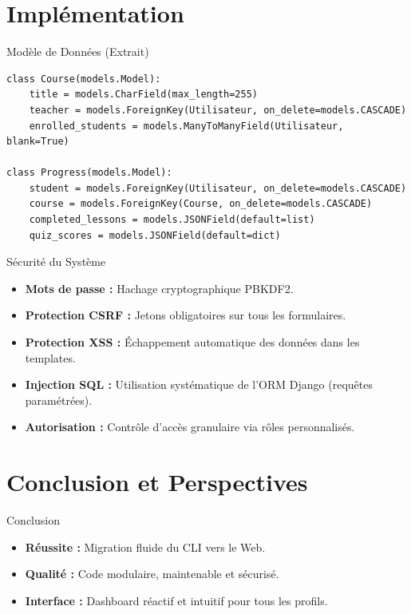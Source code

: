 \documentclass[10pt]{beamer}
\begin{document}
\section{Impl\'{e}mentation}

\begin{frame}{Mod\`{e}le de Donn\'{e}es (Extrait)}
    \begin{lstlisting}
class Course(models.Model):
    title = models.CharField(max_length=255)
    teacher = models.ForeignKey(Utilisateur, on_delete=models.CASCADE)
    enrolled_students = models.ManyToManyField(Utilisateur, blank=True)

class Progress(models.Model):
    student = models.ForeignKey(Utilisateur, on_delete=models.CASCADE)
    course = models.ForeignKey(Course, on_delete=models.CASCADE)
    completed_lessons = models.JSONField(default=list)
    quiz_scores = models.JSONField(default=dict)
    \end{lstlisting}
\end{frame}

\begin{frame}{S\'{e}curit\'{e} du Syst\`{e}me}
    \begin{itemize}
        \item \textbf{Mots de passe :} Hachage cryptographique PBKDF2.
        \item \textbf{Protection CSRF :} Jetons obligatoires sur tous les formulaires.
        \item \textbf{Protection XSS :} \'{E}chappement automatique des donn\'{e}es dans les templates.
        \item \textbf{Injection SQL :} Utilisation syst\'{e}matique de l'ORM Django (requ\^{e}tes param\'{e}tr\'{e}es).
        \item \textbf{Autorisation :} Contr\^{o}le d'acc\`{e}s granulaire via r\^{o}les personnalis\'{e}s.
    \end{itemize}
\end{frame}

\section{Conclusion et Perspectives}

\begin{frame}{Conclusion}
    \begin{itemize}
        \item \textbf{R\'{e}ussite :} Migration fluide du CLI vers le Web.
        \item \textbf{Qualit\'{e} :} Code modulaire, maintenable et s\'{e}curis\'{e}.
        \item \textbf{Interface :} Dashboard r\'{e}actif et intuitif pour tous les profils.
    \end{itemize}
\end{frame}
\end{document}
